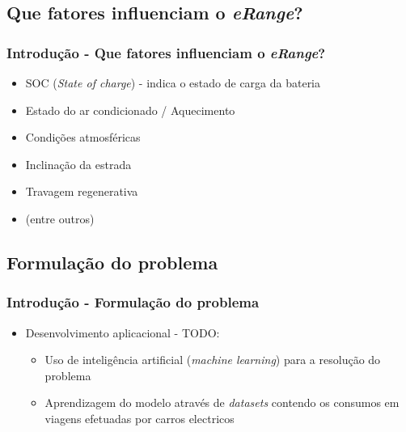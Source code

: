 \documentclass{beamer}
\begin{document}
\subsection[Que fatores influenciam o \textit{eRange}?]{Que fatores influenciam o \textit{eRange}?}
\begin{frame}
\frametitle{Introdução - Que fatores influenciam o \textit{eRange}?}

\begin{itemize}
	\item SOC (\textit{State of charge}) - indica o estado de carga da bateria
	\item Estado do ar condicionado / Aquecimento
	\item Condições atmosféricas
	\item Inclinação da estrada
	\item Travagem regenerativa
	\item (entre outros)
\end{itemize}


\end{frame}

\subsection[Formulação do problema]{Formulação do problema}
\begin{frame}
\frametitle{Introdução - Formulação do problema}

\begin{itemize}
	\item Desenvolvimento aplicacional - TODO:
	\begin{itemize}
		\item Uso de inteligência artificial (\textit{machine learning}) para a resolução do problema
		\item Aprendizagem do modelo através de \textit{datasets} contendo os consumos em viagens efetuadas por carros electricos
	\end{itemize}
\end{itemize}

\end{frame}
\end{document}
